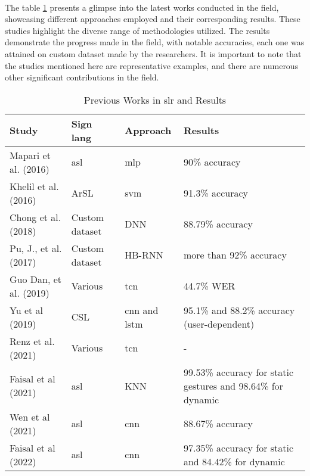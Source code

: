 \paragraph{}
The table \ref{tab:previous-works} presents a glimpse into the latest works conducted in the field, showcasing different approaches employed and their corresponding results. These studies highlight the diverse range of methodologies utilized. The results demonstrate the progress made in the field, with notable accuracies, each one was attained on custom dataset made by the researchers. It is important to note that the studies mentioned here are representative examples, and there are numerous other significant contributions in the field.
\begin{table}[h]
	\centering
	\caption{Previous Works in \ac{slr} and Results}
	\label{tab:previous-works}
	\begin{tabular}{|p{}|p{}|p{}|p{}|}
		\hline
		\textbf{Study} & \textbf{Sign lang} & \textbf{Approach} & \textbf{Results} \\
		\hline
		Mapari et al. (2016)\cite{mapari2016american} & \ac{asl} & \ac{mlp} & 90\% accuracy \\
		\hline
		Khelil et al. (2016) \cite{khelil2016hand} & ArSL & \ac{svm} & 91.3\% accuracy \\
		\hline
		Chong et al. (2018) \cite{chong2018american} & Custom dataset & DNN & 88.79\% accuracy \\
		\hline
		Pu, J., et al. (2017) \cite{fang2017deepasl} & Custom dataset & HB-RNN & more than 92\% accuracy	\\
		\hline
		Guo Dan, et al. (2019) \cite{guo2019dense} & Various &  \ac{tcn} & 44.7\% WER \\
		\hline
		Yu et al (2019) \cite{yu2019exploration} & CSL & \ac{cnn} and \ac{lstm} & 95.1\% and 88.2\% accuracy (user-dependent) \\
		\hline
		Renz et al. (2021) \cite{renz2021sign} & Various & \ac{tcn} & - \\
		\hline
		Faisal et al (2021) \cite{faisal2021sensor} & \ac{asl} & KNN & 99.53\% accuracy for static gestures and 98.64\% for dynamic \\
		\hline
		Wen et al (2021) \cite{wen2021ai} & \ac{asl} &  \ac{cnn} & 88.67\% accuracy \\
		\hline
		Faisal et al (2022) \cite{ref-article} & \ac{asl} & \ac{cnn} & 97.35\% accuracy for static and 84.42\% for dynamic \\
		\hline
	\end{tabular}
\end{table}
